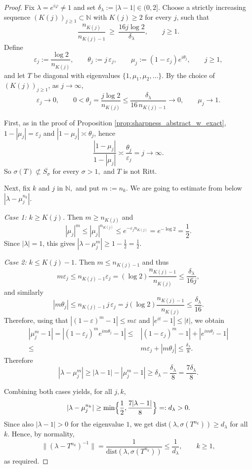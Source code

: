 \documentclass[11pt]{amsart}
\numberwithin{equation}{section}
\theoremstyle{definition}
\theoremstyle{plain}
\def\dist{\mathrm{dist}}
\begin{document}
\begin{proof}
Fix $\lambda=e^{i\varphi}\neq1$ and set $\delta_\lambda:=|\lambda-1|\in(0,2]$.
Choose a strictly increasing sequence $(K(j))_{j \ge 1}\subset \mathbb N$ with $K(j)\ge2$ for every $j$, such that
\[
\frac{n_{K(j)}}{n_{K(j)-1}}\ \ge\ \frac{16j\log2}{\delta_\lambda},\qquad j\ge1.
\]
Define
\[
\varepsilon_j:=\frac{\log2}{n_{K(j)}},\qquad
\theta_j:=j\,\varepsilon_j,\qquad
\mu_j:=(1-\varepsilon_j)e^{i\theta_j}, \qquad j \ge 1,
\]
and let $T$ be diagonal with eigenvalues $\{1,\mu_1,\mu_2,\dots\}$.
By the choice of \((K(j))_{j\ge1}\), as \(j\to\infty\),
\[
        \varepsilon_j\longrightarrow0,
        \qquad
        0<\theta_j
        =
        \frac{j\log2}{n_{K(j)}}
        \le
        \frac{\delta_\lambda}{16\,n_{K(j)-1}}
        \longrightarrow0,
        \qquad
        \mu_j\longrightarrow1.
\]

First, as in the  proof of Proposition \ref{prop:sharpness_abstract_w_exact},
$1-|\mu_j|=\varepsilon_j$ and $|1-\mu_j|\asymp \theta_j$, hence
\[
\frac{|1-\mu_j|}{1-|\mu_j|}
\asymp
\frac{\theta_j}{\varepsilon_j}
=
j
\longrightarrow\infty.
\]
So
\(
   \sigma(T)\not\subset\overline{S_\sigma}\)
for every $\sigma>1,$
and \(T\) is not Ritt.

Next,
fix $k$ and $j$ in $\mathbb N,$ and put $m:=n_k$.  We are going to estimate from below $|\lambda-\mu^{n_k}_j|$.

\emph{Case 1: $k\ge K(j)$.}
Then $m\ge n_{K(j)}$ and
\[
|\mu_j|^m\le |\mu_j|^{n_{K(j)}}\le e^{-\varepsilon_j n_{K(j)}}=e^{-\log2}=\frac12.
\]
Since $|\lambda|=1$, this gives $|\lambda-\mu_j^m|\ge 1-\frac12=\frac12$.

\emph{Case 2: $k\le K(j)-1$.}
Then $m\le n_{K(j)-1}$ and thus
\[
m\varepsilon_j\le n_{K(j)-1}\varepsilon_j=(\log2)\frac{n_{K(j)-1}}{n_{K(j)}}
\le \frac{\delta_\lambda}{16j},
\]
and similarly
\[
|m\theta_j|\le n_{K(j)-1}\,j\,\varepsilon_j
=j(\log2)\frac{n_{K(j)-1}}{n_{K(j)}}
\le \frac{\delta_\lambda}{16}.
\]
Therefore, using that $|(1-\varepsilon)^m-1|\le m\varepsilon$ and $|e^{it}-1|\le |t|$, we obtain
\begin{align*}
|\mu_j^m-1|
=|(1-\varepsilon_j)^m e^{im\theta_j}-1|
\le& |(1-\varepsilon_j)^m-1|+|e^{im\theta_j}-1|
\\
\le& m\varepsilon_j+|m\theta_j|
\le \frac{\delta_\lambda}{8}.
\end{align*}
Therefore
\[
|\lambda-\mu_j^m|
\ge |\lambda-1|-|\mu_j^m-1|
\ge \delta_\lambda-\frac{\delta_\lambda}{8}
=\frac{7\delta_\lambda}{8}.
\]

Combining both cases yields, for all $j,k$,
\[
|\lambda-\mu_j^{n_k}|\ge \min\Bigl\{\frac12,\frac{7|\lambda-1|}{8}\Bigr\}=:d_\lambda>0.
\]
Since also $|\lambda-1|>0$ for the eigenvalue $1$, we get
$\dist(\lambda,\sigma(T^{n_k}))\ge d_\lambda$ for all $k$. Hence, by normality,
\[
\|(\lambda -T^{n_k})^{-1}\|=\frac{1}{\dist(\lambda,\sigma(T^{n_k}))}\le \frac1{d_\lambda},
\qquad k\ge1,
\]
as required.
\end{proof}
\end{document}
